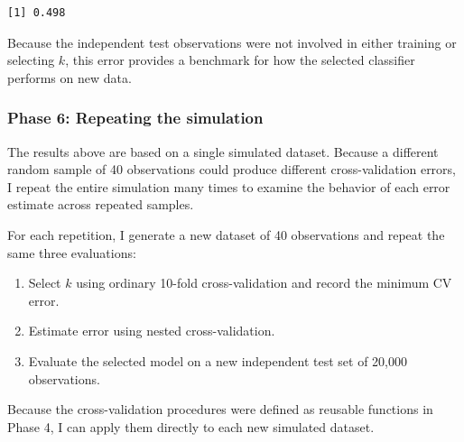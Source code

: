 \documentclass[
  letterpaper,
  DIV=11,
  numbers=noendperiod]{scrreprt}
\providecommand{\tightlist}{%
  \setlength{\itemsep}{0pt}\setlength{\parskip}{0pt}}
\begin{document}
\begin{verbatim}
[1] 0.498
\end{verbatim}

Because the independent test observations were not involved in either
training or selecting \(k\), this error provides a benchmark for how the
selected classifier performs on new data.

\subsubsection{Phase 6: Repeating the
simulation}\label{phase-6-repeating-the-simulation}

The results above are based on a single simulated dataset. Because a
different random sample of 40 observations could produce different
cross-validation errors, I repeat the entire simulation many times to
examine the behavior of each error estimate across repeated samples.

For each repetition, I generate a new dataset of 40 observations and
repeat the same three evaluations:

\begin{enumerate}
\def\labelenumi{\arabic{enumi}.}
\tightlist
\item
  Select \(k\) using ordinary 10-fold cross-validation and record the
  minimum CV error.
\item
  Estimate error using nested cross-validation.
\item
  Evaluate the selected model on a new independent test set of 20,000
  observations.
\end{enumerate}

Because the cross-validation procedures were defined as reusable
functions in Phase 4, I can apply them directly to each new simulated
dataset.
\end{document}
